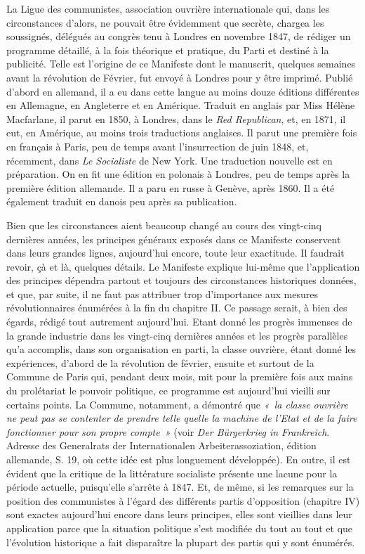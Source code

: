 \documentclass[french,twoside]{book} %
\begin{document}
\noindent La Ligue des communistes, association ouvrière internationale qui, dans les circonstances d’alors, ne pouvait être évidemment que secrète, chargea les soussignés, délégués au congrès tenu à Londres en novembre 1847, de rédiger un programme détaillé, à la fois théorique et pratique, du Parti et destiné à la publicité. Telle est l’origine de ce Manifeste dont le manuscrit, quelques semaines avant la révolution de Février, fut envoyé à Londres pour y être imprimé. Publié d’abord en allemand, il a eu dans cette langue au moins douze éditions différentes en Allemagne, en Angleterre et en Amérique. Traduit en anglais par Miss Hélène Macfarlane, il parut en 1850, à Londres, dans le \emph{Red Republican}, et, en 1871, il eut, en Amérique, au moins trois traductions anglaises. Il parut une première fois en français à Paris, peu de temps avant l’insurrection de juin 1848, et, récemment, dans \emph{Le Socialiste} de New York. Une traduction nouvelle est en préparation. On en fit une édition en polonais à Londres, peu de temps après la première édition allemande. Il a paru en russe à Genève, après 1860. Il a été également traduit en danois peu après sa publication.\par
Bien que les circonstances aient beaucoup changé au cours des vingt-cinq dernières années, les principes généraux exposés dans ce Manifeste conservent dans leurs grandes lignes, aujourd’hui encore, toute leur exactitude. Il faudrait revoir, çà et là, quelques détails. Le Manifeste explique lui-même que l’application des principes dépendra partout et toujours des circonstances historiques données, et que, par suite, il ne faut pas attribuer trop d’importance aux mesures révolutionnaires énumérées à la fin du chapitre II. Ce passage serait, à bien des égards, rédigé tout autrement aujourd’hui. Etant donné les progrès immenses de la grande industrie dans les vingt-cinq dernières années et les progrès parallèles qu’a accomplis, dans son organisation en parti, la classe ouvrière, étant donné les expériences, d’abord de la révolution de février, ensuite et surtout de la Commune de Paris qui, pendant deux mois, mit pour la première fois aux mains du prolétariat le pouvoir politique, ce programme est aujourd’hui vieilli sur certains points. La Commune, notamment, a démontré que \emph{« la classe ouvrière ne peut pas se contenter de prendre telle quelle la machine de l’Etat et de la faire fonctionner pour son propre compte »} (voir \emph{Der Bürgerkrieg in Frankreich}. Adresse des Generalrats der Internationalen Arbeiterassoziation, édition allemande, S. 19, où cette idée est plus longuement développée). En outre, il est évident que la critique de la littérature socialiste présente une lacune pour la période actuelle, puisqu’elle s’arrête à 1847. Et, de même, si les remarques sur la position des communistes à l’égard des différents partis d’opposition (chapitre IV) sont exactes aujourd’hui encore dans leurs principes, elles sont vieillies dans leur application parce que la situation politique s’est modifiée du tout au tout et que l’évolution historique a fait disparaître la plupart des partis qui y sont énumérés.\par
\end{document}
